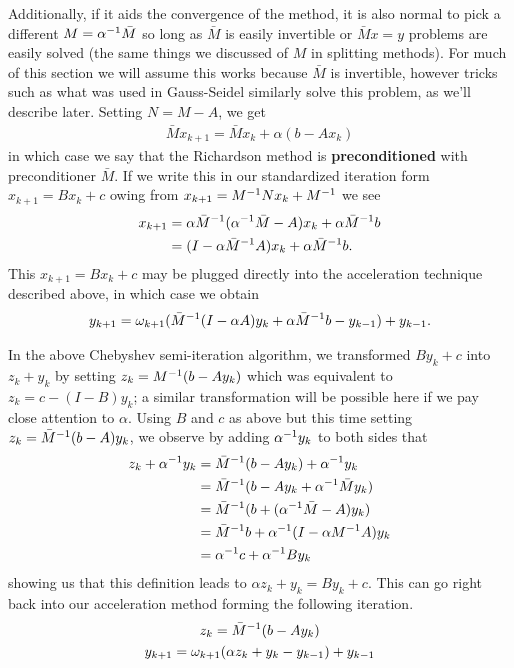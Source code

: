 \documentclass[11pt]{article}
\begin{document}
Additionally, if it aids the convergence of the method, it is also normal to pick a different $M= \alpha^{-1} \bar M $ so long as $\bar M$ is easily invertible or $\bar M x = y$ problems are easily solved (the same things we discussed of $M$ in splitting methods). For much of this section we will assume this works because $\bar M$ is invertible, however tricks such as what was used in Gauss-Seidel similarly solve this problem, as we'll describe later. Setting $N = M - A$, we get \begin{gather*}
\bar M x_{k+1} = \bar M x_k + \alpha (b - Ax_k)
\end{gather*}
in which case we say that the Richardson method is \textbf{preconditioned} with preconditioner $\bar M$. If we write this in our standardized iteration form $x_{k+1} = Bx_k + c$ owing from $x_{k+1} = M^{-1} N x_k + M^{-1}$ we see \begin{align*}
x_{k+1} &= \alpha \bar M^{-1} (\alpha^{-1} \bar M - A) x_k + \alpha \bar M^{-1} b \\
&= (I - \alpha \bar M ^{-1} A) x_k + \alpha \bar M ^{-1} b.
\end{align*}
This $x_{k+1} = Bx_k + c$ may be plugged directly into the acceleration technique described above, in which case we obtain  \begin{gather*}
y_{k+1} = \omega_{k+1} (\bar M^{-1} (I - \alpha A) y_k + \alpha \bar M^{-1} b - y_{k-1}) + y_{k-1}.
\end{gather*}

In the above Chebyshev semi-iteration algorithm, we transformed $By_k + c$ into $z_k + y_k$ by setting $z_k = M^{-1} (b - Ay_k)$ which was equivalent to $z_k = c - (I - B)y_k$; a similar transformation will be possible here if we pay close attention to $\alpha$. Using $B$ and $c$ as above but this time setting $z_k = \bar M^{-1} (b - A)y_k$, we observe by adding $\alpha^{-1} y_k$ to both sides that \begin{align*}
z_k + \alpha^{-1} y_k &= \bar M^{-1} (b - Ay_k) + \alpha^{-1} y_k \\
&=  \bar M^{-1} (b - Ay_k + \alpha^{-1} \bar M y_k) \\
&=  \bar M^{-1} (b + (\alpha^{-1} \bar M - A) y_k ) \\
&=  \bar M^{-1} b + \alpha^{-1} ( I - \alpha M^{-1} A )y_k \\
&= \alpha^{-1} c + \alpha^{-1} B y_k
\end{align*}
showing us that this definition leads to $\alpha z_k + y_k = By_k + c$. This can go right back into our acceleration method forming the following iteration.\begin{gather*}
z_k = \bar M^{-1} (b - Ay_k) \\
y_{k+1} = \omega_{k+1} (\alpha z_k + y_k - y_{k-1}) + y_{k-1}
\end{gather*}
\end{document}
